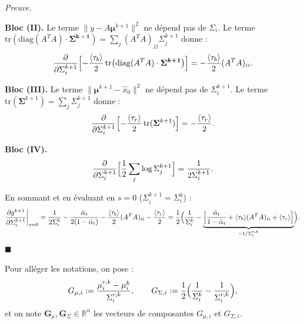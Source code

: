 \documentclass[12pt]{article}
\newcommand{\alt}{\bar\alpha_t}
\renewcommand{\qedsymbol}{$\blacksquare$}
\renewenvironment{proof}[1][\proofname]{%
  \par\medskip\noindent
  \textit{\color{proofgray}#1.}\enspace\ignorespaces
}{\hfill\qedsymbol\par\medskip}
\renewcommand{\proofname}{Preuve}
\begin{document}
\begin{proof}
\textbf{Bloc (II).} Le terme $\|y - A\boldsymbol{\mu}^{k+1}\|^2$ ne dépend pas de $\Sigma_i$. Le terme $\mathrm{tr}(\mathrm{diag}(A^TA)\cdot\boldsymbol{\Sigma^{k+1}}) = \sum_j(A^TA)_{jj}\Sigma_j^{k+1}$ donne :
\begin{equation*}
\frac{\partial}{\partial \Sigma_i^{k+1}}\Bigl[-\frac{\langle\tau_b\rangle}{2}\,\mathrm{tr}\bigl(\mathrm{diag}(A^TA)\cdot\boldsymbol{\Sigma^{k+1}}\bigr)\Bigr] = -\frac{\langle\tau_b\rangle}{2}(A^TA)_{ii}.
\end{equation*}

\textbf{Bloc (III).} Le terme $\|\boldsymbol{\mu}^{k+1} - \hat{x}_0\|^2$ ne dépend pas de $\Sigma_i^{k+1}$. Le terme $\mathrm{tr}(\boldsymbol{\Sigma}^{k+1}) = \sum_j\Sigma_j^{k+1}$ donne :
\begin{equation*}
\frac{\partial}{\partial \Sigma_i^{k+1}}\Bigl[-\frac{\langle\tau_r\rangle}{2}\,\mathrm{tr}(\boldsymbol{\Sigma}^{k+1})\Bigr] = -\frac{\langle\tau_r\rangle}{2}.
\end{equation*}

\textbf{Bloc (IV).}
\begin{equation*}
\frac{\partial}{\partial \Sigma_i^{k+1}}\Bigl[\frac{1}{2}\sum_j \log\Sigma_j^{k+1}\Bigr] = \frac{1}{2\Sigma_i^{k+1}}.
\end{equation*}

En sommant et en évaluant en $s=0$ ($\Sigma_i^{k+1} = \Sigma_i^k$) :
\begin{equation}
\frac{\partial g^{k+1}}{\partial \Sigma_i^{k+1}}\bigg|_{s=0} = \frac{1}{2\Sigma_i^k} - \frac{\alt}{2(1-\alt)} - \frac{\langle\tau_b\rangle}{2}(A^TA)_{ii} - \frac{\langle\tau_r\rangle}{2} = \frac{1}{2}\Bigl(\frac{1}{\Sigma_i^k} - \underbrace{\Bigl[\frac{\alt}{1-\alt} + \langle\tau_b\rangle(A^TA)_{ii} + \langle\tau_r\rangle\Bigr]}_{= 1/\Sigma_i^{r,k}}\Bigr).
\label{eq:dg_dSigma_expanded}
\end{equation}
\end{proof}

\medskip

Pour alléger les notations, on pose :
\begin{equation}
G_{\mu,i} := \frac{\mu_i^{r,k} - \mu_i^k}{\Sigma_i^{r,k}}, \qquad G_{\Sigma,i} := \frac{1}{2}\Bigl(\frac{1}{\Sigma_i^k} - \frac{1}{\Sigma_i^{r,k}}\Bigr),
\label{eq:Gnotation}
\end{equation}
et on note $\boldsymbol{G}_\mu, \boldsymbol{G}_\Sigma \in \mathbb{R}^n$ les vecteurs de composantes $G_{\mu,i}$ et $G_{\Sigma,i}$.

\end{document}
